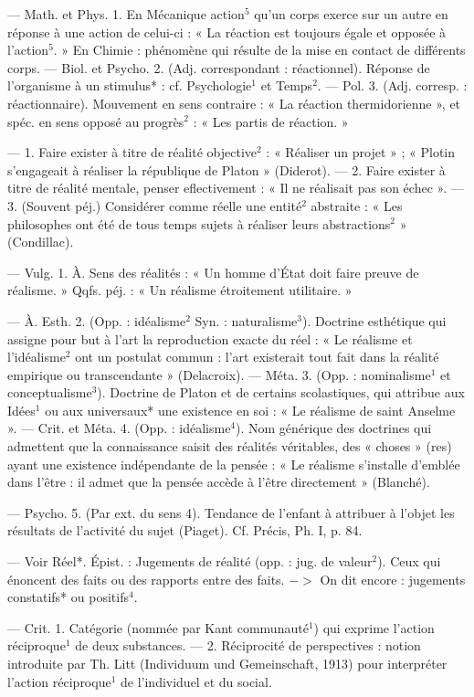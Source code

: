 \begin{itemize}[leftmargin=1cm, label=, itemsep=1pt]
 — Math. et Phys. 1. En
Mécanique action$^5$ qu’un corps
exerce sur un autre en réponse à
une action de celui-ci : « La réaction
est toujours égale et opposée à
l'action$^5$. » En Chimie : phénomène
qui résulte de la mise en contact de
différents corps. — Biol. et Psycho.
2. (Adj. correspondant : réactionnel).
Réponse de l'organisme à un stimulus* : cf. Psychologie$^1$ et Temps$^2$.
— Pol. 3. (Adj. corresp. : réactionnaire). Mouvement en sens contraire : « La réaction thermidorienne », et spéc. en sens opposé au
progrès$^2$ : « Les partis de réaction. »

 — 1. Faire exister à titre de
réalité objective$^2$ : « Réaliser un
projet » ; « Plotin s'engageait à réaliser la république de Platon » (Diderot). — 2. Faire exister à titre de
réalité mentale, penser eflectivement : « Il ne réalisait pas son
échec ». — 3. (Souvent péj.) Considérer comme réelle une entité$^2$ abstraite : « Les philosophes ont été
de tous temps sujets à réaliser leurs
abstractions$^2$ » (Condillac).

 — Vulg. 1. À. Sens des réalités : « Un homme d’État doit faire
preuve de réalisme. » Qqfs. péj. :
« Un réalisme étroitement utilitaire. »

— À. Esth. 2. (Opp. : idéalisme$^2$
Syn. : naturalisme$^3$). Doctrine esthétique qui assigne pour but à l’art
la reproduction exacte du réel : « Le
réalisme et l’idéalisme$^2$ ont un postulat
commun : l'art existerait tout
fait dans la réalité empirique ou
transcendante » (Delacroix). —
Méta. 3. (Opp. : nominalisme$^1$ et
conceptualisme$^3$). Doctrine de Platon
et de certains scolastiques, qui
attribue aux Idées$^1$ ou aux universaux* une existence en soi : « Le
réalisme de saint Anselme ». —
Crit. et Méta. 4. (Opp. : idéalisme$^4$).
Nom générique des doctrines qui
admettent que la connaissance saisit
des réalités véritables, des « choses »
(res) ayant une existence indépendante de la pensée : « Le réalisme
s’installe d'emblée dans l'être : il
admet que la pensée accède à l'être
directement » (Blanché).

— Psycho. 5. (Par ext. du sens 4).
Tendance de l’enfant à attribuer à
l’objet les résultats de l’activité du
sujet (Piaget). Cf. Précis, Ph. I,
p. 84.

 — Voir Réel*. Épist. : Jugements de réalité (opp. : jug. de valeur$^2$). Ceux qui énoncent des faits
ou des rapports entre des faits.
$->$ On dit encore : jugements constatifs* ou positifs$^4$.

 — Crit. 1. Catégorie
(nommée par Kant communauté$^1$)
qui exprime l’action réciproque$^1$ de
deux substances. — 2. Réciprocité de
perspectives : notion introduite par
Th. Litt (Individuum und Gemeinschaft, 1913) pour interpréter l’action
réciproque$^1$ de l'individuel et du
social.


\end{itemize}
